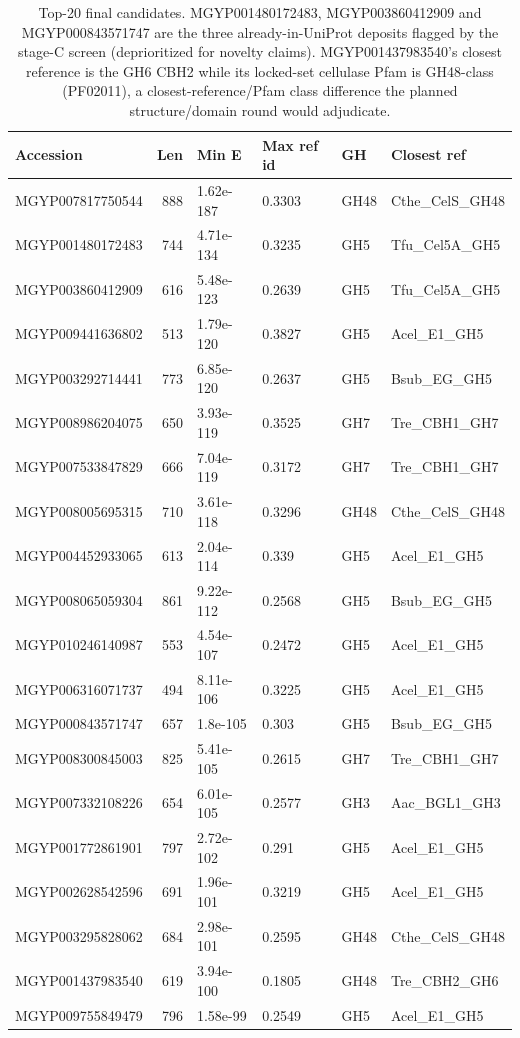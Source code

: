 \documentclass[11pt]{article}
\begin{document}
\begin{table}[h]
\centering\footnotesize
{}
\begin{tabular}{|l|r|l|l|l|l|}
\hline
\rowcolor{lightnavy}\textbf{Accession} & \textbf{Len} & \textbf{Min E} & \textbf{Max ref id} & \textbf{GH} & \textbf{Closest ref} \\\hline
MGYP007817750544 & 888 & 1.62e-187 & 0.3303 & GH48 & Cthe\_CelS\_GH48 \\\hline
MGYP001480172483 & 744 & 4.71e-134 & 0.3235 & GH5 & Tfu\_Cel5A\_GH5 \\\hline
MGYP003860412909 & 616 & 5.48e-123 & 0.2639 & GH5 & Tfu\_Cel5A\_GH5 \\\hline
MGYP009441636802 & 513 & 1.79e-120 & 0.3827 & GH5 & Acel\_E1\_GH5 \\\hline
MGYP003292714441 & 773 & 6.85e-120 & 0.2637 & GH5 & Bsub\_EG\_GH5 \\\hline
MGYP008986204075 & 650 & 3.93e-119 & 0.3525 & GH7 & Tre\_CBH1\_GH7 \\\hline
MGYP007533847829 & 666 & 7.04e-119 & 0.3172 & GH7 & Tre\_CBH1\_GH7 \\\hline
MGYP008005695315 & 710 & 3.61e-118 & 0.3296 & GH48 & Cthe\_CelS\_GH48 \\\hline
MGYP004452933065 & 613 & 2.04e-114 & 0.339 & GH5 & Acel\_E1\_GH5 \\\hline
MGYP008065059304 & 861 & 9.22e-112 & 0.2568 & GH5 & Bsub\_EG\_GH5 \\\hline
MGYP010246140987 & 553 & 4.54e-107 & 0.2472 & GH5 & Acel\_E1\_GH5 \\\hline
MGYP006316071737 & 494 & 8.11e-106 & 0.3225 & GH5 & Acel\_E1\_GH5 \\\hline
MGYP000843571747 & 657 & 1.8e-105 & 0.303 & GH5 & Bsub\_EG\_GH5 \\\hline
MGYP008300845003 & 825 & 5.41e-105 & 0.2615 & GH7 & Tre\_CBH1\_GH7 \\\hline
MGYP007332108226 & 654 & 6.01e-105 & 0.2577 & GH3 & Aac\_BGL1\_GH3 \\\hline
MGYP001772861901 & 797 & 2.72e-102 & 0.291 & GH5 & Acel\_E1\_GH5 \\\hline
MGYP002628542596 & 691 & 1.96e-101 & 0.3219 & GH5 & Acel\_E1\_GH5 \\\hline
MGYP003295828062 & 684 & 2.98e-101 & 0.2595 & GH48 & Cthe\_CelS\_GH48 \\\hline
MGYP001437983540 & 619 & 3.94e-100 & 0.1805 & GH48 & Tre\_CBH2\_GH6 \\\hline
MGYP009755849479 & 796 & 1.58e-99 & 0.2549 & GH5 & Acel\_E1\_GH5 \\\hline
\end{tabular}
\caption{Top-20 final candidates. MGYP001480172483, MGYP003860412909 and MGYP000843571747 are the three already-in-UniProt deposits flagged by the stage-C screen (deprioritized for novelty claims). MGYP001437983540's closest reference is the GH6 CBH2 while its locked-set cellulase Pfam is GH48-class (PF02011), a closest-reference/Pfam class difference the planned structure/domain round would adjudicate.}
\end{table}
\end{document}

